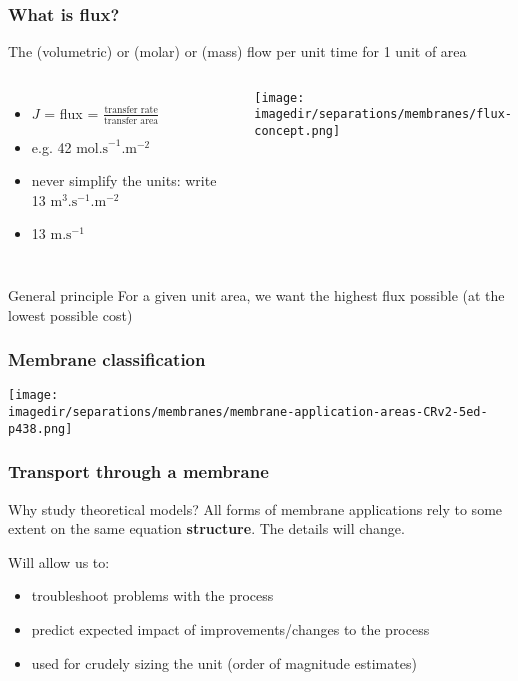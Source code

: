 \begin{frame}\frametitle{What is flux?}
	\begin{exampleblock}{}
		\centering
		\small The (volumetric) or (molar) or (mass) flow per unit time for 1 unit of area
	\end{exampleblock}
	\vspace{12pt}
	\begin{columns}[t]
			\begin{itemize}
				\item	$J$ = flux = $\displaystyle \frac{\text{transfer rate}}{\text{transfer area}}$
				\item	e.g. 42 $\text{mol.s}^{-1}\text{.m}^{-2}$
				\item	never simplify the units: write 13 $\text{m}^3.\text{s}^{-1}\text{.m}^{-2}$
				\item	{\color{myRed}{do not write}} 13 $\text{m}\text{.s}^{-1}$
			\end{itemize}
			\begin{center}
				\texttt{[image: \\imagedir/separations/membranes/flux-concept.png]}
			\end{center}
	\end{columns}
	\begin{exampleblock}{General principle}
		For a given unit area, we want the highest flux possible (at the lowest possible cost)
	\end{exampleblock}	
\end{frame}

\begin{frame}\frametitle{Membrane classification}
	
	\begin{center}
		\texttt{[image: \\imagedir/separations/membranes/membrane-application-areas-CRv2-5ed-p438.png]}
	\end{center}
	
\end{frame}

\begin{frame}\frametitle{Transport through a membrane}
	\begin{exampleblock}{Why study theoretical models?}
		All forms of membrane applications rely to some extent on the same equation \textbf{structure}. The details will change.
	\end{exampleblock}

	\vspace{12pt}
	
	Will allow us to:
	\begin{itemize}
		\item	troubleshoot problems with the process
		\item	predict expected impact of improvements/changes to the process
		\item	used for crudely sizing the unit (order of magnitude estimates)
	\end{itemize}

\end{frame}

